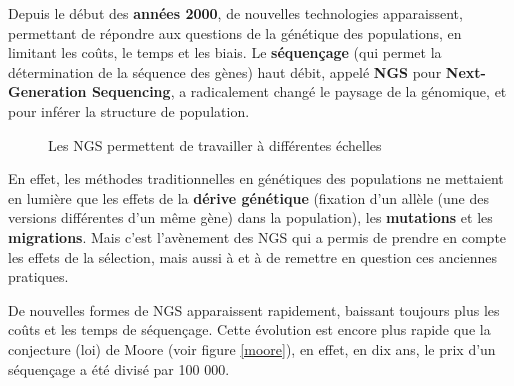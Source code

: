 \documentclass[a4paper]{article}
\begin{document}
Depuis le début des \textbf{années 2000}, de nouvelles technologies apparaissent, permettant de répondre aux questions de la génétique des populations, en limitant les coûts, le temps et les biais. Le \textbf{séquençage} (qui permet la détermination de la séquence des gènes) haut débit, appelé \textbf{NGS} pour \textbf{Next-Generation Sequencing}, a radicalement changé le paysage de la génomique, et pour inférer la structure de population.

\begin{figure}[!h]
\caption{Les NGS permettent de travailler à différentes échelles\cite{shendure2012expanding}}
\end{figure}

En effet, les méthodes traditionnelles en génétiques des populations ne mettaient en lumière que les effets de la \textbf{dérive génétique} (fixation d'un allèle (une des versions différentes d'un même gène) dans la population), les \textbf{mutations} et les \textbf{migrations}. Mais c'est l'avènement des NGS qui a permis de prendre en compte les effets de la sélection, mais aussi à \cite{bazin2006population} et à \cite{kashi2006simple} de remettre en question ces anciennes pratiques. 

De nouvelles formes de NGS apparaissent rapidement, baissant toujours plus les coûts et les temps de séquençage. Cette évolution est encore plus rapide que la conjecture (loi) de Moore (voir figure \ref{moore}), en effet, en dix ans, le prix d'un séquençage a été divisé par 100 000.
\end{document}
